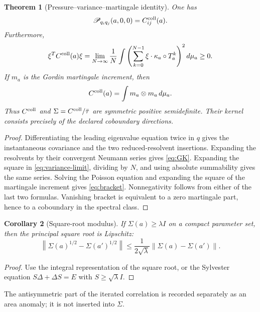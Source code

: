 \documentclass[11pt,reqno]{amsart}
\newtheorem{theorem}{Theorem}[section]
\newtheorem{corollary}[theorem]{Corollary}
\theoremstyle{definition}
\theoremstyle{remark}
\newcommand{\norm}[1]{\left\lVert #1\right\rVert}
\begin{document}
\begin{theorem}[Pressure--variance--martingale identity]\label{thm:GK}
One has
\begin{equation}\label{eq:pressure-GK}
 \mathscr P_{q_iq_j}(a,0,0)=C_{ij}^{\rm coll}(a).
\end{equation}
Furthermore,
\begin{equation}\label{eq:variance-limit}
 \xi^TC^{\rm coll}(a)\xi
 =\lim_{N\to\infty}\frac1N
 \int\left(\sum_{k=0}^{N-1}
 \xi\cdot\kappa_a\circ T_a^k\right)^2d\mu_a\ge0.
\end{equation}
If $m_a$ is the Gordin martingale increment, then
\begin{equation}\label{eq:bracket}
 C^{\rm coll}(a)=\int m_a\otimes m_a\,d\mu_a.
\end{equation}
Thus $C^{\rm coll}$ and $\Sigma=C^{\rm coll}/\bar\tau$ are symmetric positive
semidefinite.  Their kernel consists precisely of the declared coboundary
directions.
\end{theorem}

\begin{proof}
Differentiating the leading eigenvalue equation twice in $q$ gives the
instantaneous covariance and the two reduced-resolvent insertions.  Expanding
the resolvents by their convergent Neumann series gives \eqref{eq:GK}.
Expanding the square in \eqref{eq:variance-limit}, dividing by $N$, and using
absolute summability gives the same series.  Solving the Poisson equation and
expanding the square of the martingale increment gives \eqref{eq:bracket}.
Nonnegativity follows from either of the last two formulas.  Vanishing bracket
is equivalent to a zero martingale part, hence to a coboundary in the spectral
class.
\end{proof}

\begin{corollary}[Square-root modulus]\label{cor:sqrt}
If $\Sigma(a)\ge\lambda I$ on a compact parameter set, then the principal
square root is Lipschitz:
\[
 \norm{\Sigma(a)^{1/2}-\Sigma(a')^{1/2}}
 \le\frac1{2\sqrt\lambda}
 \norm{\Sigma(a)-\Sigma(a')}.
\]
\end{corollary}

\begin{proof}
Use the integral representation of the square root, or the Sylvester equation
$S\Delta+\Delta S=E$ with $S\ge\sqrt\lambda I$.
\end{proof}

The antisymmetric part of the iterated correlation is recorded separately as
an area anomaly; it is not inserted into $\Sigma$.
\end{document}
